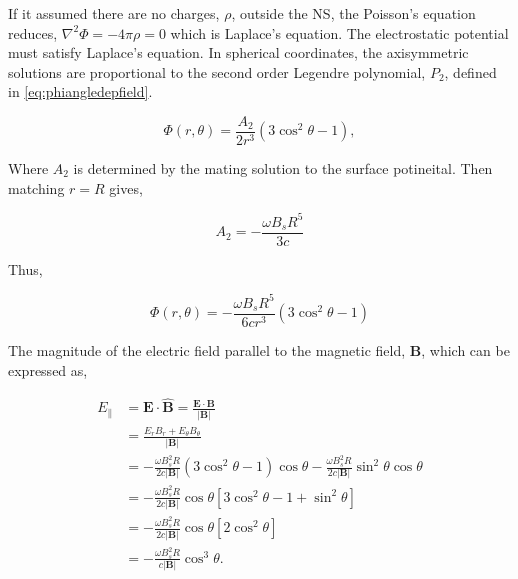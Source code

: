 If it assumed there are no charges, $\rho$, outside the NS, the Poisson's equation reduces, $\nabla^2 \Phi = -4\pi \rho = 0$ which is Laplace's equation. The electrostatic potential must satisfy Laplace's equation. In spherical coordinates, the axisymmetric solutions are proportional to the second order Legendre polynomial, $P_2$, defined in \cref{eq:phiangledepfield}.

\begin{equation}
    \Phi(r, \theta) = \frac{A_2}{2r^3}  \left(3 \cos^2 \theta-1 \right),
\end{equation}

Where $A_2$ is determined by the mating solution to the surface potineital. Then matching $r=R$ gives, 

\begin{equation}
    A_2 = - \frac{\omega B_s R^5}{3c}
\end{equation}

Thus, 

\begin{equation}
    \Phi (r, \theta) = - \frac{\omega B_s R^5}{6cr^3} (3 \cos^2 \theta -1) 
\end{equation}

The magnitude of the electric field parallel to the magnetic field, $\mathbf{B}$, which can be expressed as,


\begin{align}
    E_\parallel
    &= \mathbf{E}\cdot\hat{\mathbf{B}}
     = \frac{\mathbf{E}\cdot\mathbf{B}}{|\mathbf{B}|} \\
    &= \frac{E_r B_r + E_\theta B_\theta}{|\mathbf{B}|} \\
    &= -\frac{\omega B_s^2 R}{2c|\mathbf{B}|}
       (3\cos^2\theta - 1)\cos\theta
       - \frac{\omega B_s^2 R}{2c|\mathbf{B}|}
       \sin^2\theta\cos\theta \\
    &= -\frac{\omega B_s^2 R}{2c|\mathbf{B}|}
       \cos\theta
       \left[3\cos^2\theta - 1 + \sin^2\theta\right] \\
    &= -\frac{\omega B_s^2 R}{2c|\mathbf{B}|}
       \cos\theta\left[2\cos^2\theta\right] \\
    &= -\frac{\omega B_s^2 R}{c|\mathbf{B}|}
       \cos^3\theta.
\end{align}

